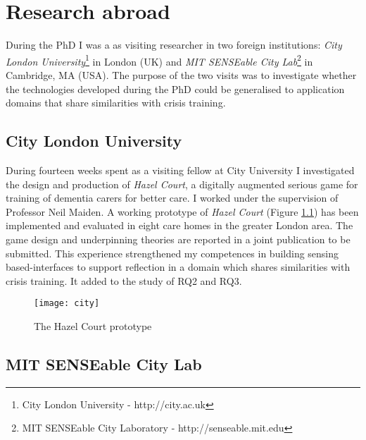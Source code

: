 \chapter{Research abroad}\label{abroad}

During the PhD I was a as visiting researcher in two foreign institutions: \emph{City London University}\footnote{City London University - http://city.ac.uk} in London (UK) and \emph{MIT SENSEable City Lab}\footnote{MIT SENSEable City Laboratory - http://senseable.mit.edu} in Cambridge, MA (USA). The purpose of the two visits was to investigate whether the technologies developed during the PhD could be generalised to application domains that share similarities with crisis training.

\section{City London University}

During fourteen weeks spent as a visiting fellow at City University I investigated the design and production of \emph{Hazel Court}, a digitally augmented serious game for training of dementia carers for better care. I worked under the supervision of Professor Neil Maiden. A working prototype of \emph{Hazel Court} (Figure \ref{fig:hazel-court}) has been implemented and evaluated in eight care homes in the greater London area. The game design and underpinning theories are reported in a joint publication to be submitted. This experience strengthened my competences in building sensing based-interfaces to support reflection in a domain which shares similarities with crisis training. It added to the study of RQ2 and RQ3.
\begin{figure}
	[h] \centering 
	\texttt{[image: city]} \caption{The Hazel Court prototype} \label{fig:hazel-court} 
\end{figure}

\section{MIT SENSEable City Lab}

